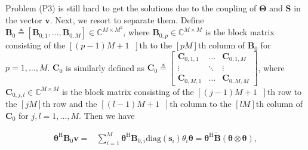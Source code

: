 \documentclass[journal]{IEEEtran}
\begin{document}
{ Problem (P3) is still hard to get the solutions due to the coupling of  $\boldsymbol {\Theta}$ and  $\mathbf{S}$ in the vector $\mathbf {v}$. Next, we resort to separate them.
Define $\mathbf {B}_{0}\triangleq[\mathbf {B}_{0,1}, \ldots {}, \mathbf {B}_{0,M}]\in \mathbb {C}^{M \times M^{2}}$, where $\mathbf {B}_{0,p}\in \mathbb {C}^{M \times M}$ is the block matrix consisting of the $[(p - 1) M + 1 {\;\;\!\!\!}]$th to the $[pM]$th column of $\mathbf {B}_{0}$ for $p\! \!=\!\! 1,\! \ldots \!{}, M$. $\mathbf {C}_{0}$ is similarly defined as $\mathbf {C}_{0}\triangleq\begin{bmatrix}
\mathbf{C}_{0,1,1}& \!\ldots\! {}&\mathbf {C}_{0,1,M}\\
\!\vdots\! {}&\ddots&\vdots {}\\
\mathbf {C}_{0,M,1}& \ldots {}&\mathbf {C}_{0,M,M}
\end{bmatrix}$,
where $\mathbf {C}_{0,j,l}\in \mathbb {C}^{M \times M}$ is the block matrix consisting of the $[(j - 1) M + 1 {\;\;\!\!\!}]$th row to the $[jM]$th row and the $[(l - 1) M + 1 {\;\;\!\!\!}]$th column to the $[lM]$th column of $\mathbf {C}_{0}$ for $j,l\! \!=\!\! 1,\! \ldots \!{}, M$. Then we have

\vspace{-5mm}

\begin{equation} \begin{aligned} 
{\boldsymbol {\theta}}^{\mathrm{H}}\mathbf {B}_{0}\mathbf {v}
=&\sum _{i=1}^{M}\boldsymbol{\theta}^{\mathrm{H}}{\mathbf {B}}_{0,i}{\mathrm {diag}}(\mathbf{s}_{i}) {\theta}_{i}\boldsymbol {\theta}
=\boldsymbol {\theta}^{\mathrm{H}}\tilde{\mathbf {B}}(\boldsymbol {\theta}\otimes\boldsymbol {\theta}),
\end{aligned}\end{equation}

}
\end{document}
